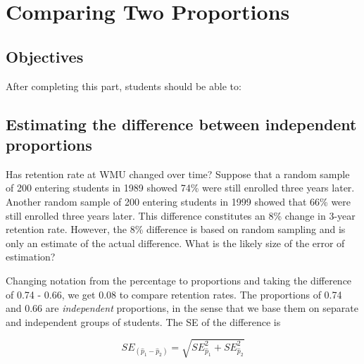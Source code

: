 \documentclass[11pt]{book}\usepackage[]{graphicx}\usepackage[]{color}
\begin{document}
\onecolumn



\chapter{Comparing Two Proportions }
\label{chap:ch9}

\section{Objectives}

After completing this part, students should be able to:


\section{Estimating the difference between independent proportions}

Has retention rate at WMU changed over time?  Suppose that a random sample of 200 entering students in 1989 showed 74\% were still enrolled three years later.  Another random sample of 200 entering students in 1999 showed that 66\% were still enrolled three years later.  This difference constitutes an 8\% change in 3-year retention rate.  However, the 8\% difference is based on random sampling and is only an estimate of the actual difference.  What is the likely size of the error of estimation?

Changing notation from the percentage to proportions and taking the difference of
0.74 - 0.66, we get 0.08 to compare retention rates.  The proportions of 0.74 and 0.66 are \textit{independent} proportions, in the sense that we base them on separate and independent groups of students.  The SE of the difference is

\begin{equation*}
  SE_{(\hat{p}_1 - \hat{p}_2)} = \sqrt{ SE_{\hat{p}_1}^2 + SE_{\hat{p}_2}^2}
\end{equation*}
\end{document}
